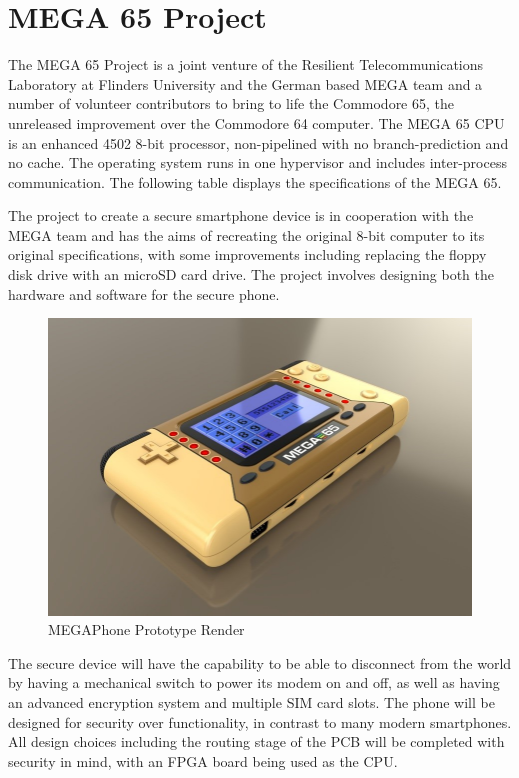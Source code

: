 \section{MEGA 65 Project}
\label{chap2sec7}

The MEGA 65 Project is a joint venture of the Resilient Telecommunications Laboratory at Flinders University and the German based MEGA team and a number of volunteer contributors to bring to life the Commodore 65, the unreleased improvement over the Commodore 64 computer.
The MEGA 65 CPU is an enhanced 4502 8-bit processor, non-pipelined with no branch-prediction and no cache.
The operating system runs in one hypervisor and includes inter-process communication.
The following table displays the specifications of the MEGA 65. 



The project to create a secure smartphone device is in cooperation with the MEGA team and has the aims of recreating the original 8-bit computer to its original specifications, with some improvements including replacing the floppy disk drive with an microSD card drive.
The project involves designing both the hardware and software for the secure phone. 

\begin{figure}
	\includegraphics[width=\linewidth]{render.jpg}
	\caption{MEGAPhone Prototype Render}
	\label{fig:render}
\end{figure}

The secure device will have the capability to be able to disconnect from the world by having a mechanical switch to power its modem on and off, as well as having an advanced encryption system and multiple SIM card slots.
The phone will be designed for security over functionality, in contrast to many modern smartphones.
All design choices including the routing stage of the PCB will be completed with security in mind, with an FPGA board being used as the CPU.

